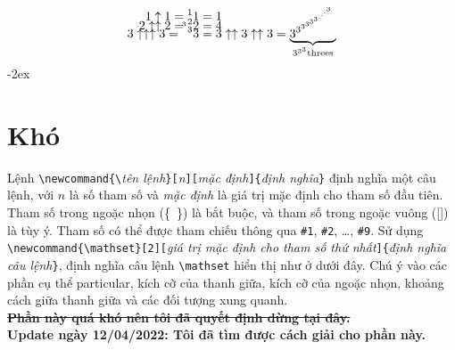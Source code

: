 \documentclass[a4paper,12pt,notitlepage]{article}
\newcommand{\mathset}[2][]{ %
	\ifthenelse{\isempty{#2}}
	{
		\emptyset
	}
	{
	\ifthenelse{\isempty{#1}} %
	{
	\left\{
		#2
	\right\}
	}
	{ %
	\left\{
		#1\,\middle|\,#2
	\right\}
	}
	}
}
\begin{document}
	\begin{align}
		1 \uparrow 1 = {^1}1 &= 1 \nonumber \\[-2ex]
		2 \uparrow \uparrow 2 = {^2}2 &= 4 \nonumber \\[-2ex]
		3 \uparrow \uparrow \uparrow 3 = \smash{{^{^{^3}3}}3} %
		&= 3 \uparrow \uparrow 3 \uparrow \uparrow 3 = \underbrace{\smash{3^{3^{3^{3^{3^{3^{.^{.^{.^{3}}}}}}}}}}}_{3^{3^3} \text{threes}}
	\end{align}
	\newpage
	\openup -2ex
	\section{Khó}
	Lệnh \verb+\newcommand{\+\textit{tên lệnh}\verb+}[+\textit{n}\verb+][+\textit{mặc định}\verb+]{+\textit{định nghĩa}\verb+}+ định nghĩa một câu lệnh, với $n$ là
	số tham số và \textit{mặc định} là giá trị mặc định cho tham số đầu tiên.
	Tham số trong ngoặc nhọn \mbox{(\{ {} \})} là bắt buộc, và tham số trong ngoặc vuông ([\phantom{a}]) là tùy ý. 
	Tham số có thể được tham chiếu thông qua \verb|#1|, \verb|#2|, \ldots , \verb|#9|. 
	Sử dụng \verb+\newcommand{\mathset}[2][+\textit{giá trị mặc định cho tham số thứ nhất}\verb+]{+\textit{định nghĩa câu lệnh}\verb+}+, định nghĩa câu lệnh \verb+\mathset+ hiển thị như ở dưới đây. 
	Chú ý vào các phần cụ thể particular, kích cỡ của thanh giữa, kích cỡ của ngoặc nhọn, khoảng cách giữa thanh giữa và các đối tượng xung quanh. \\
	\sout{\textbf{Phần này quá khó nên tôi đã quyết định dừng tại đây.}} \\
	\textbf{Update ngày 12/04/2022: Tôi đã tìm được cách giải cho phần này.} \\
\end{document}
